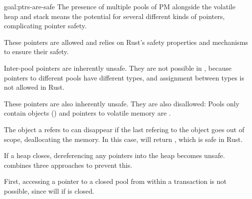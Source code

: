 \begin{goaltrue}{goal:ptrs-are-safe}
The presence of multiple pools of PM alongside the volatile heap and stack
means the potential for several different kinds of pointers, complicating 
pointer safety.

 These pointers are allowed and \this{}
relies on Rust's safety properties and mechanisms to ensure their safety.

 Inter-pool pointers are inherently
unsafe.  They are not possible in \this{}, because pointers to different
pools have different types, and assignment between types is not allowed in Rust.


 These pointers are
also inherently unsafe.  They are also disallowed: Pools only contain
 objects () and pointers to
volatile memory are . 

 The object a
 refers to can disappear if the last  refering to the
object goes out of scope, deallocating the memory. In this case,
 will return , which is safe in Rust.

 If a heap closes, dereferencing any
pointers into the heap becomes unsafe.  \This{} combines three approaches to
prevent this.

First, accessing a pointer to a closed pool from within a transaction is not
possible, since  will  if  is
closed.


\end{goaltrue}
